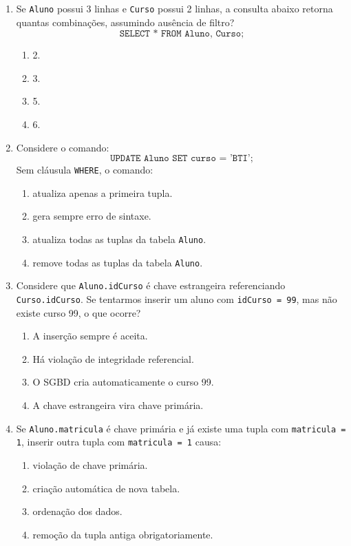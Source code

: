 \documentclass[12pt,a4paper]{article}
\begin{document}
\begin{enumerate}[resume,label=\textbf{Q\arabic*.}]
\item Se \texttt{Aluno} possui 3 linhas e \texttt{Curso} possui 2 linhas, a consulta abaixo retorna quantas combinações, assumindo ausência de filtro?
\[
\texttt{SELECT * FROM Aluno, Curso;}
\]

\begin{enumerate}[label=\alph*)]
    \item 2.
    \item 3.
    \item 5.
    \item 6.
\end{enumerate}

\item Considere o comando:
\[
\texttt{UPDATE Aluno SET curso = 'BTI';}
\]
Sem cláusula \texttt{WHERE}, o comando:

\begin{enumerate}[label=\alph*)]
    \item atualiza apenas a primeira tupla.
    \item gera sempre erro de sintaxe.
    \item atualiza todas as tuplas da tabela \texttt{Aluno}.
    \item remove todas as tuplas da tabela \texttt{Aluno}.
\end{enumerate}

\item Considere que \texttt{Aluno.idCurso} é chave estrangeira referenciando \texttt{Curso.idCurso}. Se tentarmos inserir um aluno com \texttt{idCurso = 99}, mas não existe curso 99, o que ocorre?

\begin{enumerate}[label=\alph*)]
    \item A inserção sempre é aceita.
    \item Há violação de integridade referencial.
    \item O SGBD cria automaticamente o curso 99.
    \item A chave estrangeira vira chave primária.
\end{enumerate}

\item Se \texttt{Aluno.matricula} é chave primária e já existe uma tupla com \texttt{matricula = 1}, inserir outra tupla com \texttt{matricula = 1} causa:

\begin{enumerate}[label=\alph*)]
    \item violação de chave primária.
    \item criação automática de nova tabela.
    \item ordenação dos dados.
    \item remoção da tupla antiga obrigatoriamente.
\end{enumerate}


\end{enumerate}
\end{document}
